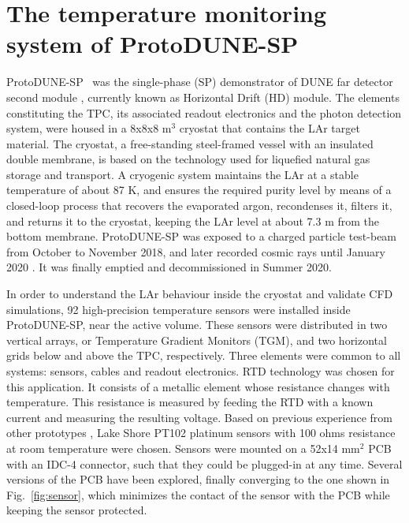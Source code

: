 \section{The temperature monitoring system of ProtoDUNE-SP}
\label{sec:protoDUNE}

ProtoDUNE-SP~\cite{pdsp_tdr} was the single-phase (SP) demonstrator of DUNE far detector second module \cite{dune_tdr4}, currently known as Horizontal Drift (HD) module. %
The elements constituting the TPC, its associated readout electronics and the photon detection system, were housed in a 8x8x8 m$^3$ cryostat that contains the LAr target material. The cryostat, a free-standing steel-framed vessel with an insulated double membrane, is based on the technology used for liquefied natural gas storage and transport. A cryogenic system maintains the LAr at a stable temperature of about 87 K, and ensures the required purity level by means of a closed-loop process that recovers the evaporated argon, recondenses it, filters it, and returns it to the cryostat, keeping the LAr level at about 7.3 m from the bottom membrane. ProtoDUNE-SP was exposed to a charged particle test-beam from October to November 2018, and later recorded cosmic rays until January 2020 \cite{pdsp_1,pdsp_2}. It was finally emptied and decommissioned in Summer 2020.

In order to understand the LAr behaviour inside the cryostat and validate CFD simulations, 92 high-precision temperature sensors were installed inside ProtoDUNE-SP, near the active volume. These sensors were distributed in two vertical arrays, or Temperature Gradient Monitors (TGM), and two horizontal grids below and above the TPC, respectively. Three elements were common to all systems: sensors, cables and readout electronics. RTD technology \cite{minco} was chosen for this application. It consists of a metallic element whose resistance changes with temperature. This resistance is measured by feeding the RTD with a known current and measuring the resulting voltage. Based on previous experience from other prototypes \cite{35t_1}, Lake Shore PT102 platinum sensors \cite{pt102} with 100 ohms resistance at room temperature were chosen. Sensors were mounted on a 52x14 mm$^2$ PCB with an IDC-4 connector, such that they could be plugged-in at any time. Several versions of the PCB have been explored, finally converging to the one shown in Fig.~\ref{fig:sensor}, which minimizes the contact of the sensor with the PCB while keeping the sensor protected. 

